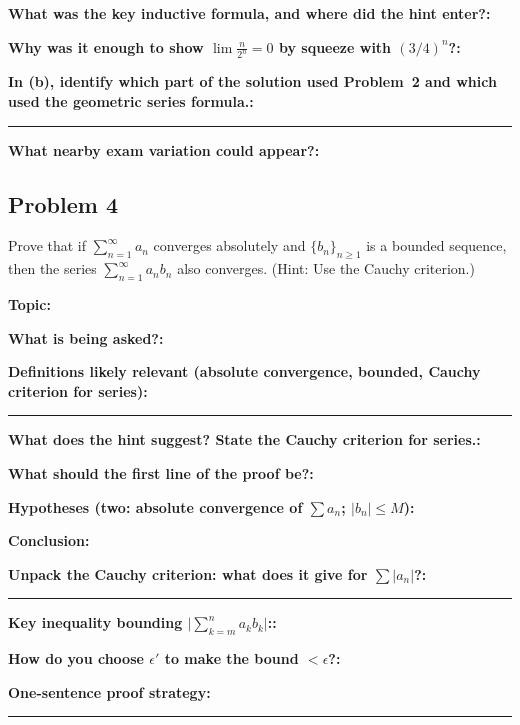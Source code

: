\documentclass[12pt]{article}
\newcommand{\fillfield}[1]{%
  \par\noindent\textbf{#1:}\enspace\hrulefill\par\vspace{3pt}%
}
\newcommand{\fillfieldlong}[1]{%
  \par\noindent\textbf{#1:}\par\vspace{1.5cm}%
  \noindent\rule{\linewidth}{0.35pt}\par\vspace{4pt}%
}
\begin{document}
\bigskip

\begin{tcolorbox}[
  enhanced, breakable,
  colback  = reflectcyan,
  colframe = cyan!55!black,
  fonttitle = \bfseries,
  title = {\textsc{Reflection \& Variation}}
]
\fillfield{What was the key inductive formula, and where did the hint enter?}
\fillfield{Why was it enough to show $\lim \frac{n}{2^n} = 0$ by squeeze with $(3/4)^n$?}
\fillfieldlong{In (b), identify which part of the solution used Problem~2 and which used the geometric series formula.}
\fillfield{What nearby exam variation could appear?}
\end{tcolorbox}

\newpage
\subsection{Problem 4}

\begin{tcolorbox}[
  enhanced, breakable,
  colback  = probblue,
  colframe = blue!55!black,
  fonttitle = \bfseries,
  title = {\textsc{Problem Statement}\hfill Homework 6, Problem 4}
]
Prove that if $\sum_{n=1}^{\infty} a_n$ converges absolutely and $\{b_n\}_{n \geq 1}$
is a bounded sequence, then the series $\sum_{n=1}^{\infty} a_n b_n$ also converges.
(Hint: Use the Cauchy criterion.)
\end{tcolorbox}

\bigskip

\begin{tcolorbox}[
  enhanced, breakable,
  colback  = pass1green,
  colframe = green!55!black,
  fonttitle = \bfseries,
  title = {Pass 1 \enspace\textbf{--}\enspace First Diagnosis}
]
\fillfield{Topic}
\fillfield{What is being asked?}
\fillfieldlong{Definitions likely relevant (absolute convergence, bounded, Cauchy criterion for series)}
\fillfield{What does the hint suggest? State the Cauchy criterion for series.}
\fillfield{What should the first line of the proof be?}
\end{tcolorbox}

\bigskip

\begin{tcolorbox}[
  enhanced, breakable,
  colback  = pass2yellow,
  colframe = yellow!65!black,
  fonttitle = \bfseries,
  title = {Pass 2 \enspace\textbf{--}\enspace Proof Recipe Card}
]
\fillfield{Hypotheses (two: absolute convergence of $\sum a_n$; $|b_n| \leq M$)}
\fillfield{Conclusion}
\fillfieldlong{Unpack the Cauchy criterion: what does it give for $\sum |a_n|$?}
\fillfield{Key inequality bounding $\bigl|\sum_{k=m}^{n} a_k b_k\bigr|$:}
\fillfield{How do you choose $\epsilon'$ to make the bound $< \epsilon$?}
\fillfieldlong{One-sentence proof strategy}
\end{tcolorbox}
\end{document}
